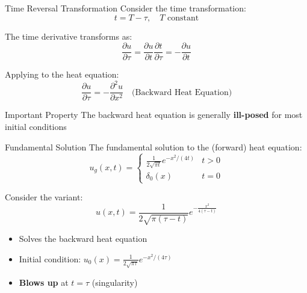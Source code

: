 \documentclass{beamer}
\begin{document}
\begin{frame}{Time Reversal Transformation}
    Consider the time transformation:
    \[
    t = T - \tau, \quad T \text{ constant}
    \]
    
    The time derivative transforms as:
    \[
    \frac{\partial u}{\partial \tau} = \frac{\partial u}{\partial t} \frac{\partial t}{\partial \tau} = -\frac{\partial u}{\partial t}
    \]
    
    Applying to the heat equation:
    \[
    \frac{\partial u}{\partial \tau} = -\frac{\partial^2 u}{\partial x^2} \quad \text{(Backward Heat Equation)}
    \]
    
    \begin{alertblock}{Important Property}
        The backward heat equation is generally \textbf{ill-posed} for most initial conditions
    \end{alertblock}
\end{frame}

\begin{frame}{Fundamental Solution}
    The fundamental solution to the (forward) heat equation:
    \[
    u_g(x,t) = 
    \begin{cases} 
    \frac{1}{2\sqrt{\pi t}} e^{-x^2/(4t)} & t > 0 \\ 
    \delta_0(x) & t = 0 
    \end{cases}
    \]
    
    Consider the variant:
    \[
    u(x,t) = \frac{1}{2\sqrt{\pi(\tau-t)}} e^{-\frac{x^2}{4(\tau-t)}}
    \]
    
    \begin{itemize}
        \item Solves the backward heat equation
        \item Initial condition: $u_0(x) = \frac{1}{2\sqrt{\pi\tau}} e^{-x^2/(4\tau)}$
        \item \textbf{Blows up} at $t = \tau$ (singularity)
    \end{itemize}
\end{frame}
\end{document}
